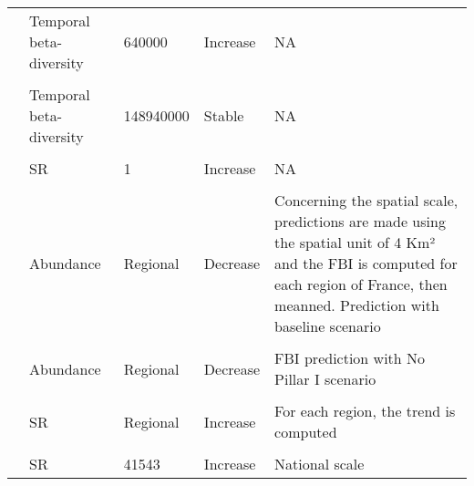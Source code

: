 \documentclass[
  12pt,
  oneside]{report}
\begin{document}
\begin{landscape}
\begin{longtable}[t]{llll>{\raggedright\arraybackslash}p{30em}}
 & Temporal beta-diversity & 640000 & Increase & NA\\
\addlinespace
\cellcolor{gray!6}{} & \cellcolor{gray!6}{Temporal beta-diversity} & \cellcolor{gray!6}{9834000} & \cellcolor{gray!6}{Increase} & \cellcolor{gray!6}{NA}\\
 & Temporal beta-diversity & 148940000 & Stable & NA\\
\cellcolor{gray!6}{\cite{davey_rise_2012}} & \cellcolor{gray!6}{Simpson} & \cellcolor{gray!6}{1} & \cellcolor{gray!6}{Increase} & \cellcolor{gray!6}{They predict the metric using a GAM with spatial resolution of 1 Km². Then they show the trend for the mean value of the metric per year}\\
 & SR & 1 & Increase & NA\\
\cellcolor{gray!6}{} & \cellcolor{gray!6}{Evenness} & \cellcolor{gray!6}{1} & \cellcolor{gray!6}{Increase} & \cellcolor{gray!6}{NA}\\
\addlinespace
\cite{chiron_forecasting_2013} & Abundance & Regional & Decrease & Concerning the spatial scale, predictions are made using the spatial unit of 4 Km² and the FBI is computed for each region of France, then meanned. Prediction with baseline scenario\\
\cellcolor{gray!6}{} & \cellcolor{gray!6}{Abundance} & \cellcolor{gray!6}{Regional} & \cellcolor{gray!6}{Decrease} & \cellcolor{gray!6}{FBI prediction with CAP greening cenario}\\
 & Abundance & Regional & Decrease & FBI prediction with No Pillar I scenario\\
\cellcolor{gray!6}{} & \cellcolor{gray!6}{Abundance} & \cellcolor{gray!6}{Regional} & \cellcolor{gray!6}{Decrease} & \cellcolor{gray!6}{FBI prediction with biofuel scenario}\\
\cite{van_turnhout_scale-dependent_2007} & SR & Regional & Increase & For each region, the trend is computed\\
\addlinespace
\cellcolor{gray!6}{} & \cellcolor{gray!6}{SR} & \cellcolor{gray!6}{25} & \cellcolor{gray!6}{Increase} & \cellcolor{gray!6}{Mainly increase of SR but the proportion of negative trend were higher than for the regional scale}\\
 & SR & 41543 & Increase & National scale\\*
\end{longtable}
\endgroup{}
\end{landscape}

\singlespacing


\renewcommand\bibname{References}
  
\end{document}
